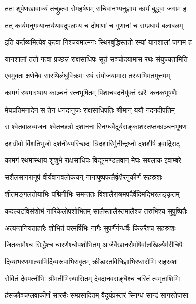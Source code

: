 
\twolineshloka
{ततः शूर्पणखावाक्यं तच्छ्रुत्वा रोमहर्षणम्}
{सचिवानभ्यनुज्ञाय कार्यं बुद्ध्वा जगाम ह} %

\twolineshloka
{तत् कार्यमनुगम्यान्तर्यथावदुपलभ्य च}
{दोषाणां च गुणानां च सम्प्रधार्य बलाबलम्} %

\twolineshloka
{इति कर्तव्यमित्येव कृत्वा निश्चयमात्मनः}
{स्थिरबुद्धिस्ततो रम्यां यानशालां जगाम ह} %

\twolineshloka
{यानशालां ततो गत्वा प्रच्छन्नं राक्षसाधिपः}
{सूतं सञ्चोदयामास रथः संयुज्यतामिति} %

\twolineshloka
{एवमुक्तः क्षणेनैव सारथिर्लघुविक्रमः}
{रथं संयोजयामास तस्याभिमतमुत्तमम्} %

\twolineshloka
{कामगं रथमास्थाय काञ्चनं रत्नभूषितम्}
{पिशाचवदनैर्युक्तं खरैः कनकभूषणैः} %

\twolineshloka
{मेघप्रतिमनादेन स तेन धनदानुजः}
{राक्षसाधिपतिः श्रीमान् ययौ नदनदीपतिम्} %

\twolineshloka
{स श्वेतवालव्यजनः श्वेतच्छत्रो दशाननः}
{स्निग्धवैदूर्यसङ्काशस्तप्तकाञ्चनभूषणः} %

\twolineshloka
{दशग्रीवो विंशतिभुजो दर्शनीयपरिच्छदः}
{त्रिदशारिर्मुनीन्द्रघ्नो दशशीर्ष इवाद्रिराट्} %

\twolineshloka
{कामगं रथमास्थाय शुशुभे राक्षसाधिपः}
{विद्युन्मण्डलवान् मेघः सबलाक इवाम्बरे} %

\twolineshloka
{सशैलसागरानूपं वीर्यवानवलोकयन्}
{नानापुष्पफलैर्वृक्षैरनुकीर्णं सहस्रशः} %

\twolineshloka
{शीतमङ्गलतोयाभिः पद्मिनीभिः समन्ततः}
{विशालैराश्रमपदैर्वेदिमद्भिरलङ्कृतम्} %

\twolineshloka
{कदल्यटविसंशोभं नारिकेलोपशोभितम्}
{सालैस्तालैस्तमालैश्च तरुभिश्च सुपुष्पितैः} %

\twolineshloka
{अत्यन्तनियताहारैः शोभितं परमर्षिभिः}
{नागैः सुपर्णैर्गन्धर्वैः किन्नरैश्च सहस्रशः} %

\twolineshloka
{जितकामैश्च सिद्धैश्च चारणैश्चोपशोभितम्}
{आजैर्वैखानसैर्माषैर्वालखिल्यैर्मरीचिपैः} %

\twolineshloka
{दिव्याभरणमाल्याभिर्दिव्यरूपाभिरावृतम्}
{क्रीडारतविधिज्ञाभिरप्सरोभिः सहस्रशः} %

\twolineshloka
{सेवितं देवपत्नीभिः श्रीमतीभिरुपासितम्}
{देवदानवसङ्घैश्च चरितं त्वमृताशिभिः} %

\twolineshloka
{हंसक्रौञ्चप्लवाकीर्णं सारसैः सम्प्रसादितम्}
{वैदूर्यप्रस्तरं स्निग्धं सान्द्रं सागरतेजसा} %

